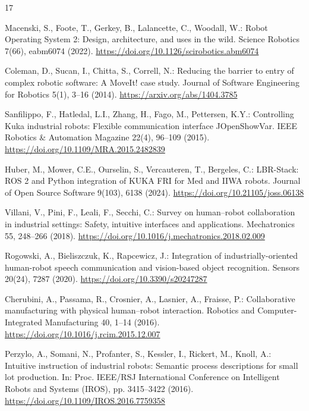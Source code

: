 \documentclass{svproc}
\begin{document}
\begin{thebibliography}{17}

Macenski, S., Foote, T., Gerkey, B., Lalancette, C., Woodall, W.: Robot Operating System 2: Design, architecture, and uses in the wild. Science Robotics 7(66), eabm6074 (2022). \url{https://doi.org/10.1126/scirobotics.abm6074}

Coleman, D., Sucan, I., Chitta, S., Correll, N.: Reducing the barrier to entry of complex robotic software: A MoveIt! case study. Journal of Software Engineering for Robotics 5(1), 3--16 (2014). \url{https://arxiv.org/abs/1404.3785}

Sanfilippo, F., Hatledal, L.I., Zhang, H., Fago, M., Pettersen, K.Y.: Controlling Kuka industrial robots: Flexible communication interface JOpenShowVar. IEEE Robotics \& Automation Magazine 22(4), 96--109 (2015). \url{https://doi.org/10.1109/MRA.2015.2482839}

Huber, M., Mower, C.E., Ourselin, S., Vercauteren, T., Bergeles, C.: LBR-Stack: ROS 2 and Python integration of KUKA FRI for Med and IIWA robots. Journal of Open Source Software 9(103), 6138 (2024). \url{https://doi.org/10.21105/joss.06138}

Villani, V., Pini, F., Leali, F., Secchi, C.: Survey on human--robot collaboration in industrial settings: Safety, intuitive interfaces and applications. Mechatronics 55, 248--266 (2018). \url{https://doi.org/10.1016/j.mechatronics.2018.02.009}

Rogowski, A., Bieliszczuk, K., Rapcewicz, J.: Integration of industrially-oriented human-robot speech communication and vision-based object recognition. Sensors 20(24), 7287 (2020). \url{https://doi.org/10.3390/s20247287}

Cherubini, A., Passama, R., Crosnier, A., Lasnier, A., Fraisse, P.: Collaborative manufacturing with physical human--robot interaction. Robotics and Computer-Integrated Manufacturing 40, 1--14 (2016). \url{https://doi.org/10.1016/j.rcim.2015.12.007}

Perzylo, A., Somani, N., Profanter, S., Kessler, I., Rickert, M., Knoll, A.: Intuitive instruction of industrial robots: Semantic process descriptions for small lot production. In: Proc. IEEE/RSJ International Conference on Intelligent Robots and Systems (IROS), pp. 3415--3422 (2016). \url{https://doi.org/10.1109/IROS.2016.7759358}


\end{thebibliography}
\end{document}
